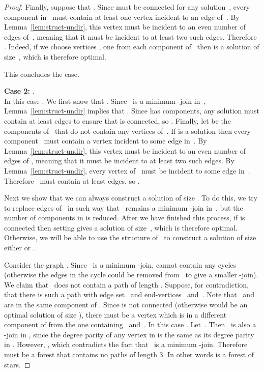 \documentclass[11pt]{llncs}
\newcommand\displaycase[1]{{\bf #1}}
\begin{document}
\begin{proof}
Finally, suppose that . Since  must be connected for any
solution~, every component in~ must contain at least one vertex
incident to an edge of~. By Lemma~\ref{lem:struct-undir}, this vertex must
be incident to an even number of edges of~, meaning that it must be incident
to at least two such edges. Therefore .  Indeed, if we
choose vertices , one from each component of~ then
 is a solution of size~, which
is therefore optimal.

This concludes the  case.

\medskip
\noindent
\displaycase{Case 2:} .\\
In this case . We first show that . Since~ is a minimum -join in~,
Lemma~\ref{lem:struct-undir} implies that . Since 
has  components, any solution  must contain at least  edges to
ensure that  is connected, so . Finally, let
 be the components of~ that do not contain any vertices
of~. If  is a solution then every component~ must contain a vertex
incident to some edge in~.  By Lemma~\ref{lem:struct-undir}, this vertex
must be incident to an even number of edges of , meaning that it must be
incident to at least two such edges.  By Lemma~\ref{lem:struct-undir}, every
vertex of~ must be incident to some edge in~. Therefore~ must contain
at least  edges, so .

Next we show that we can always construct a solution of size
. To do this, we try to replace edges of~
in such way that~ remains a minimum -join in~, but the number of
components in  is reduced. After we have finished this process, if 
is connected then setting  gives a solution of size~, which is
therefore optimal. Otherwise, we will be able to use the structure of~ to
construct a solution of size either  or .

Consider the graph . Since~ is a minimum -join,  cannot
contain any cycles (otherwise the edges in the cycle could be removed from~
to give a smaller -join).  We claim that~ does not contain a path of
length .  Suppose, for contradiction, that there is such a path with
edge set~ and end-vertices~ and~.  Note that~ and~ are in the
same component of . Since  is not connected (otherwise  would be
an optimal solution of size ), there must be a vertex  which
is in a different component of  from the one containing~ and~. In this
case .  Let~. Then~ is
also a -join in , since the degree parity of any vertex in  is
the same as its degree parity in . However, , which contradicts
the fact that~ is a minimum -join.  Therefore  must be a forest
that contains no paths of length 3. In other words  is a forest of
stars.


\end{proof}
\end{document}
